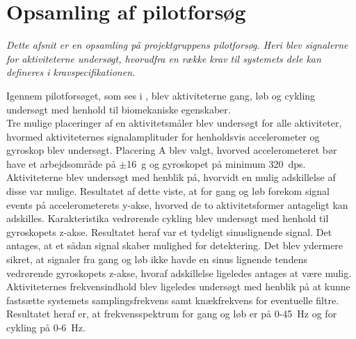 \section{Opsamling af pilotforsøg}\label{opsamling_pilot}
\textit{Dette afsnit er en opsamling på projektgruppens pilotforsøg. Heri blev signalerne for aktiviteterne undersøgt, hvorudfra en række krav til systemets dele kan defineres i kravspecifikationen.}

Igennem pilotforsøget, som ses i , blev aktiviteterne gang, løb og cykling undersøgt med henhold til biomekaniske egenskaber. \\
Tre mulige placeringer af en aktivitetsmåler blev undersøgt for alle aktiviteter, hvormed aktiviteternes signalamplituder for henholdsvis accelerometer og gyroskop blev undersøgt. Placering A blev valgt, hvorved accelerometeret bør have et arbejdsområde på $\pm$16~g og gyroskopet på minimum 320~dps. \\
Aktiviteterne blev undersøgt med henblik på, hvorvidt en mulig adskillelse af disse var mulige. Resultatet af dette viste, at for gang og løb forekom signal events på accelerometerets y-akse, hvorved de to aktivitetsformer antageligt kan adskilles. Karakteristika vedrørende cykling blev undersøgt med henhold til gyroskopets z-akse. Resultatet heraf var et tydeligt sinuslignende signal. Det antages, at et sådan signal skaber mulighed for detektering. Det blev ydermere sikret, at signaler fra gang og løb ikke havde en sinus lignende tendens vedrørende gyroskopets z-akse, hvoraf adskillelse ligeledes antages at være mulig. \\
Aktiviteternes frekvensindhold blev ligeledes undersøgt med henblik på at kunne fastsætte systemets samplingsfrekvens samt knækfrekvens for eventuelle filtre. Resultatet heraf er, at frekvensspektrum for gang og løb er på 0-45~Hz og for cykling på 0-6~Hz. 

